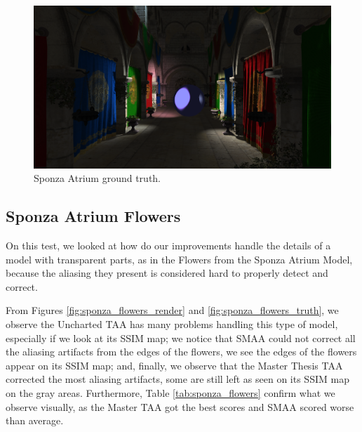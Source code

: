 \documentclass{cslthse-msc}
\begin{document}
\begin{figure}[H]
	\centering
	\includegraphics[scale=0.1]{images/results/sponza_sobel_ground_truth.png}
	\caption{Sponza Atrium ground truth.}\label{fig:sponza_truth}
\end{figure}

\subsection{Sponza Atrium Flowers}
On this test, we looked at how do our improvements handle the details of a model with transparent parts, as in the Flowers from the Sponza Atrium Model, because the aliasing they present is considered hard to properly detect and correct.

From Figures \ref{fig:sponza_flowers_render} and \ref{fig:sponza_flowers_truth}, we observe the Uncharted TAA has many problems handling this type of model, especially if we look at its SSIM map; we notice that SMAA could not correct all the aliasing artifacts from the edges of the flowers, we see the edges of the flowers appear on its SSIM map; and, finally, we observe that the Master Thesis TAA corrected the most aliasing artifacts, some are still left as seen on its SSIM map on the gray areas. Furthermore, Table \ref{tab:sponza_flowers} confirm what we observe visually, as the Master TAA got the best scores and SMAA scored worse than average.
\end{document}
